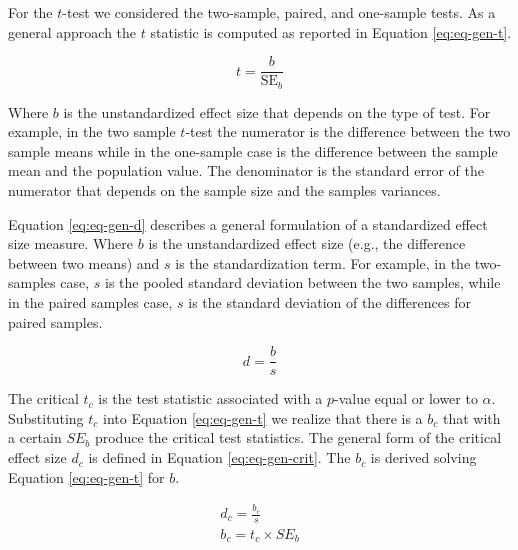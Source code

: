 \documentclass[
  man,floatsintext]{apa7}
\begin{document}
For the \(t\)-test we considered the two-sample, paired, and one-sample tests. As a general approach the \(t\) statistic is computed as reported in Equation \eqref{eq:eq-gen-t}.

\begin{equation}
    \label{eq:eq-gen-t}
    t = \frac{b}{\text{SE}_{b}}
\end{equation}

Where \(b\) is the unstandardized effect size that depends on the type of test. For example, in the two sample \(t\)-test the numerator is the difference between the two sample means while in the one-sample case is the difference between the sample mean and the population value. The denominator is the standard error of the numerator that depends on the sample size and the samples variances.

Equation \eqref{eq:eq-gen-d} describes a general formulation of a standardized effect size measure. Where \(b\) is the unstandardized effect size (e.g., the difference between two means) and \(s\) is the standardization term. For example, in the two-samples case, \(s\) is the pooled standard deviation between the two samples, while in the paired samples case, \(s\) is the standard deviation of the differences for paired samples.

\begin{equation}
    \label{eq:eq-gen-d}
    d = \frac{b}{s}
\end{equation}

The critical \(t_c\) is the test statistic associated with a \(p\)-value equal or lower to \(\alpha\). Substituting \(t_c\) into Equation \eqref{eq:eq-gen-t} we realize that there is a \(b_c\) that with a certain \(SE_b\) produce the critical test statistics. The general form of the critical effect size \(d_c\) is defined in Equation \eqref{eq:eq-gen-crit}. The \(b_c\) is derived solving Equation \eqref{eq:eq-gen-t} for \(b\).

\begin{equation}
\begin{gathered}
    \label{eq:eq-gen-crit}
    d_c = \frac{b_c}{s} \\
    b_c = t_c \times SE_b
\end{gathered}
\end{equation}
\end{document}
